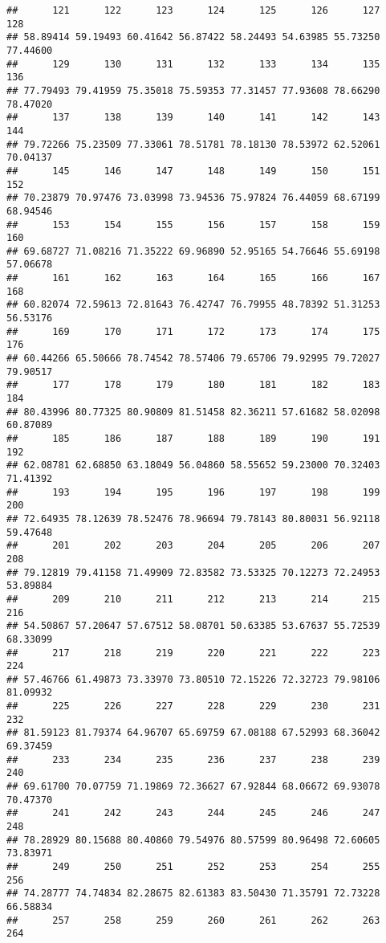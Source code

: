 \documentclass[
]{article}
\begin{document}
\begin{verbatim}
##      121      122      123      124      125      126      127      128 
## 58.89414 59.19493 60.41642 56.87422 58.24493 54.63985 55.73250 77.44600 
##      129      130      131      132      133      134      135      136 
## 77.79493 79.41959 75.35018 75.59353 77.31457 77.93608 78.66290 78.47020 
##      137      138      139      140      141      142      143      144 
## 79.72266 75.23509 77.33061 78.51781 78.18130 78.53972 62.52061 70.04137 
##      145      146      147      148      149      150      151      152 
## 70.23879 70.97476 73.03998 73.94536 75.97824 76.44059 68.67199 68.94546 
##      153      154      155      156      157      158      159      160 
## 69.68727 71.08216 71.35222 69.96890 52.95165 54.76646 55.69198 57.06678 
##      161      162      163      164      165      166      167      168 
## 60.82074 72.59613 72.81643 76.42747 76.79955 48.78392 51.31253 56.53176 
##      169      170      171      172      173      174      175      176 
## 60.44266 65.50666 78.74542 78.57406 79.65706 79.92995 79.72027 79.90517 
##      177      178      179      180      181      182      183      184 
## 80.43996 80.77325 80.90809 81.51458 82.36211 57.61682 58.02098 60.87089 
##      185      186      187      188      189      190      191      192 
## 62.08781 62.68850 63.18049 56.04860 58.55652 59.23000 70.32403 71.41392 
##      193      194      195      196      197      198      199      200 
## 72.64935 78.12639 78.52476 78.96694 79.78143 80.80031 56.92118 59.47648 
##      201      202      203      204      205      206      207      208 
## 79.12819 79.41158 71.49909 72.83582 73.53325 70.12273 72.24953 53.89884 
##      209      210      211      212      213      214      215      216 
## 54.50867 57.20647 57.67512 58.08701 50.63385 53.67637 55.72539 68.33099 
##      217      218      219      220      221      222      223      224 
## 57.46766 61.49873 73.33970 73.80510 72.15226 72.32723 79.98106 81.09932 
##      225      226      227      228      229      230      231      232 
## 81.59123 81.79374 64.96707 65.69759 67.08188 67.52993 68.36042 69.37459 
##      233      234      235      236      237      238      239      240 
## 69.61700 70.07759 71.19869 72.36627 67.92844 68.06672 69.93078 70.47370 
##      241      242      243      244      245      246      247      248 
## 78.28929 80.15688 80.40860 79.54976 80.57599 80.96498 72.60605 73.83971 
##      249      250      251      252      253      254      255      256 
## 74.28777 74.74834 82.28675 82.61383 83.50430 71.35791 72.73228 66.58834 
##      257      258      259      260      261      262      263      264 

\end{verbatim}
\end{document}
